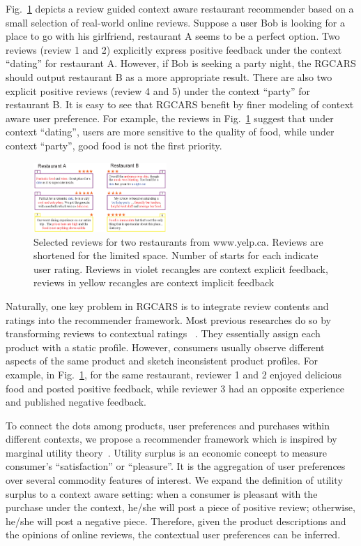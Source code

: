 \documentclass[sigconf]{acmart}
\begin{document}
Fig.~\ref{fig:example} depicts a review guided context aware restaurant recommender based on a small selection of real-world online reviews. Suppose a user Bob is looking for a place to go with his girlfriend, restaurant A seems to be a perfect option.  Two reviews (review 1 and 2) explicitly express positive feedback under the context ``dating'' for restaurant A. However, if Bob is seeking a party night, the RGCARS should output restaurant B as a more appropriate result. There are also two explicit positive reviews (review 4 and 5) under the context ``party'' for restaurant B. It is easy to see that RGCARS benefit by finer modeling of context aware user preference. For example, the reviews in Fig.~\ref{fig:example} suggest that under context ``dating'', users are more sensitive to the quality of food, while under context ``party'', good food is not the first priority.           



\begin{figure}[!ht]
\label{fig:example}
\centering
\includegraphics[width=0.45\textwidth]{example.eps}
\caption{Selected reviews for two restaurants from www.yelp.ca. Reviews are shortened for the limited space. Number of starts for each indicate user rating. Reviews in violet recangles are context explicit feedback, reviews in yellow recangles are context implicit feedback}
\end{figure}


Naturally, one key problem in RGCARS is to integrate review contents and ratings into the recommender framework. Most previous researches do so by transforming reviews to contextual ratings ~\cite{Li2010Contextual,Liu2013Combining}. They essentially assign each product with a static profile. However, consumers usually observe different aspects of the same product and sketch inconsistent product profiles. For example, in Fig.~\ref{fig:example}, for the same restaurant, reviewer 1 and 2 enjoyed delicious food and posted positive feedback, while reviewer 3 had an opposite experience and published negative feedback. 


To connect the dots among products, user preferences and purchases within different contexts, we propose a recommender framework which is inspired by marginal utility theory~\cite{samuelson1937note}. Utility surplus is an economic concept to measure consumer's ``satisfaction'' or ``pleasure''. It is the aggregation of user preferences over several commodity features of interest. We expand the definition of utility surplus to a context aware setting: when a consumer is pleasant with the purchase under the context, he/she will post a piece of positive review; otherwise, he/she will post a negative piece. Therefore, given the product descriptions and the opinions of online reviews, the contextual user preferences can be inferred.   
\end{document}
